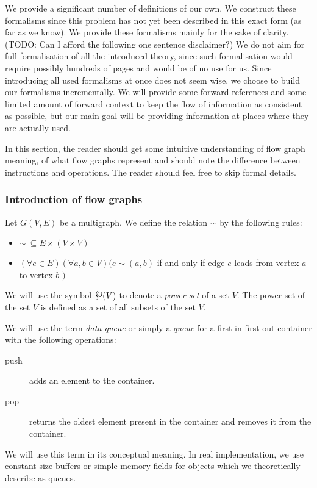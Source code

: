 

We provide a significant number of definitions of our own. We construct these formalisms since this problem has not yet been described in this exact form (as far as we know).  We provide these formalisms mainly for the sake of clarity. (TODO: Can I afford the following one sentence disclaimer?) We do not aim for full formalisation of all the introduced theory, since such formalisation would require possibly hundreds of pages and would be of no use for us. Since introducing all used formalisms at once does not seem wise, we choose to build our formalisms incrementally. We will provide some forward references and some limited amount of forward context to keep the flow of information as consistent as possible, but our main goal will be providing information at places where they are actually used.


In this section, the reader should get some intuitive understanding of flow graph meaning, of what flow graphs represent and should note the difference between instructions and operations. The reader should feel free to skip formal details.

\subsubsection{Introduction of flow graphs}

  Let $G(V,E)$ be a multigraph. We define the relation $\sim$ by the following rules: \begin{itemize}
  \item $\sim \ \subseteq E \times (V \times V)$ 
  \item $ (\forall e \in E)(\forall a,b \in V)( e \sim (a,b) $ if and only if edge $e$ leads from vertex $a$ to vertex $b$ $)$
  \end{itemize}
\myenddef


  We will use the symbol $\powerset(V)$ to denote a \emph{power set} of a set $V$. The power set of the set $V$ is defined as a set of all subsets of the set $V$.
\myenddef


  We will use the term \emph{data queue} or simply a \emph{queue} for a first-in first-out container with the following operations:
  \begin{description}
  \item[push] adds an element to the container.
  \item[pop] returns the oldest element present in the container and removes it from the container.
  \end{description}
  We will use this term in its conceptual meaning. In real implementation, we use constant-size buffers or simple memory fields for objects which we theoretically describe as queues.
\myenddef


